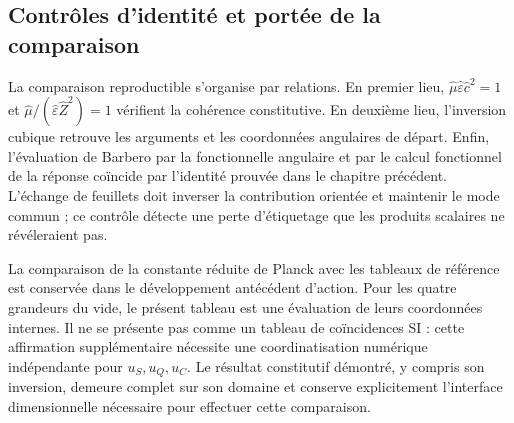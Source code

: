 \subsection{Contrôles d’identité et portée de la comparaison}

La comparaison reproductible s’organise par relations. En premier lieu,
$\widehat\mu\widehat\varepsilon\widehat c^2=1$ et
$\widehat\mu/(\widehat\varepsilon\widehat Z^2)=1$ vérifient la
cohérence constitutive. En deuxième lieu, l’inversion cubique retrouve
les arguments et les coordonnées angulaires de départ. Enfin,
l’évaluation de Barbero par la fonctionnelle angulaire et par le calcul fonctionnel
de la réponse coïncide par l’identité prouvée dans le chapitre précédent.
L’échange de feuillets doit inverser la contribution orientée et maintenir
le mode commun ; ce contrôle détecte une perte d’étiquetage que les
produits scalaires ne révéleraient pas.

La comparaison de la constante réduite de Planck avec les tableaux de
référence est conservée dans le développement antécédent d’action. Pour les
quatre grandeurs du vide, le présent tableau est une évaluation de leurs
coordonnées internes. Il ne se présente pas comme un tableau de coïncidences SI :
cette affirmation supplémentaire nécessite une coordinatisation numérique indépendante pour
$u_S,u_Q,u_C$. Le résultat constitutif démontré, y compris son inversion,
demeure complet sur son domaine et conserve explicitement l’interface
dimensionnelle nécessaire pour effectuer cette comparaison.
